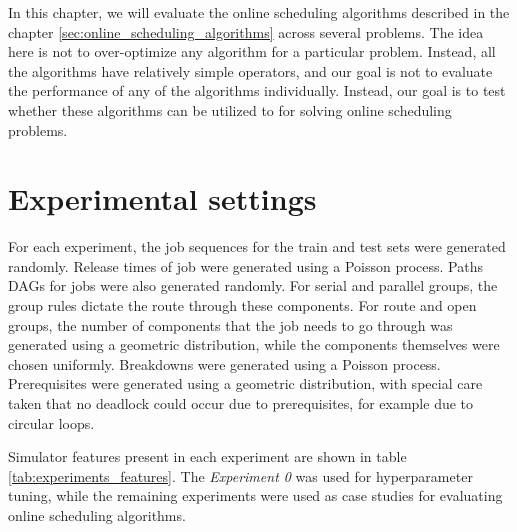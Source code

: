 In this chapter, we will evaluate the online scheduling algorithms described in the chapter \ref{sec:online_scheduling_algorithms} across several problems. The idea here is not to over-optimize any algorithm for a particular problem. Instead, all the algorithms have relatively simple operators, and our goal is not to evaluate the performance of any of the algorithms individually. Instead, our goal is to test whether these algorithms can be utilized to for solving online scheduling problems.

\section{Experimental settings}

For each experiment, the job sequences for the train and test sets were generated randomly. Release times of job were generated using a Poisson process. Paths DAGs for jobs were also generated randomly. For serial and parallel groups, the group rules dictate the route through these components. For route and open groups, the number of components that the job needs to go through was generated using a geometric distribution, while the components themselves were chosen uniformly. Breakdowns were generated using a Poisson process. Prerequisites were generated using a geometric distribution, with special care taken that no deadlock could occur due to prerequisites, for example due to circular loops.

Simulator features present in each experiment are shown in table \ref{tab:experiments_features}. The \textit{Experiment 0} was used for hyperparameter tuning, while the remaining experiments were used as case studies for evaluating online scheduling algorithms. 

\begin{table}[!htbp]
    \centering
    \caption{Simulator features in experiments}
    \label{tab:experiments_features}
\end{table}

